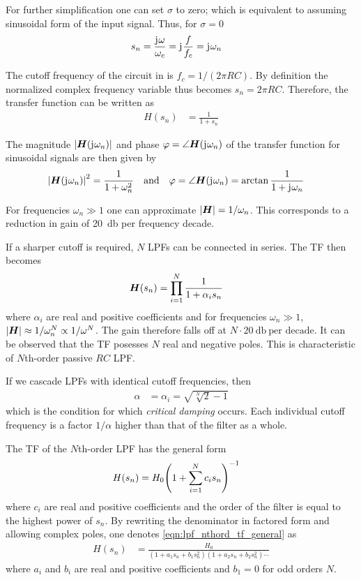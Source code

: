 For further simplification one can set $\sigma$ to zero; which is equivalent to assuming sinusoidal form of the input signal.
Thus, for $\sigma=0$
\begin{align}
  s_n &= \frac{\mathrm{j}\mkern1mu\omega}{\omega_c} = \mathrm{j}\mkern1mu\frac{f}{f_c} = \mathrm{j}\mkern1mu\omega_n
\end{align}

The cutoff frequency of the circuit in  is $f_c=1/(2\pi RC)$. By definition the normalized complex frequency variable thus becomes $s_n=2\pi RC$. Therefore, the transfer function can be written as
\begin{align}
  H(s_n) &= \frac{1}{1+s_n}
\end{align}

The magnitude $\abs{\bm{H}(\mathrm{j}\mkern1mu\omega_n)}$ and phase $\varphi=\angle\bm{H}(\mathrm{j}\mkern1mu\omega_n)$ of the transfer function for sinusoidal signals are then given by
\begin{align}
  \abs{\bm{H}(\mathrm{j}\mkern1mu\omega_n)}^2 &= \frac{1}{1+\omega_n^2} &&\text{and} &\varphi &= \angle\bm{H}(\mathrm{j}\mkern1mu\omega_n) = \arctan\frac{1}{1 + \mathrm{j}\mkern1mu\omega_n}
\end{align}

For frequencies $\omega_n\gg 1$ one can approximate $\abs{\bm{H}}=1/\omega_n$. This corresponds to a reduction in gain of \SI{20}{\decibel} per frequency decade.

If a sharper cutoff is required, $N$ \ac{LPF}s can be connected in series. The \ac{TF} then becomes
\begin{align}
  \bm{H}(s_n) &= \prod\limits_{i=1}^{N}\frac{1}{1+\alpha_i s_n}
\end{align}
where $\alpha_i$ are real and positive coefficients and for frequencies $\omega_n\gg 1$, $\abs{\bm{H}}\approx 1/\omega_n^N\propto 1/\omega^N$. The gain therefore falls off at $N\cdot\SI{20}{\decibel}\:\text{per decade}$. It can be observed that the \ac{TF} posesses $N$ real and negative poles. This is characteristic of $N$th-order passive $RC$ \ac{LPF}.

If we cascade \ac{LPF}s with identical cutoff frequencies, then
\begin{align}
  \alpha &= \alpha_i = \sqrt{\sqrt[N]{2}-1}
\end{align}
which is the condition for which \emph{critical damping} occurs. Each individual cutoff frequency is a factor $1/\alpha$ higher than that of the filter as a whole.

The \ac{TF} of the $N$th-order \ac{LPF} has the general form
\begin{align}
  H(s_n) &= H_0 \pqty{1 + \sum\limits_{i=1}^N c_i s_n}^{-1} \label{eqn:lpf_nthord_tf_general}
\end{align}
where $c_i$ are real and positive coefficients and the order of the filter is equal to the highest power of $s_n$. By rewriting the denominator in factored form and allowing complex poles, one denotes \autoref{eqn:lpf_nthord_tf_general} as
\begin{align}
  H(s_n) &= \frac{H_0}{(1+a_1s_n+b_1s_n^2)(1+a_2s_n+b_2s_n^2)\cdots} \label{eqn:lpf_nthord_tf_poles}
\end{align}
where $a_i$ and $b_i$ are real and positive coefficients and $b_1=0$ for odd orders $N$.

